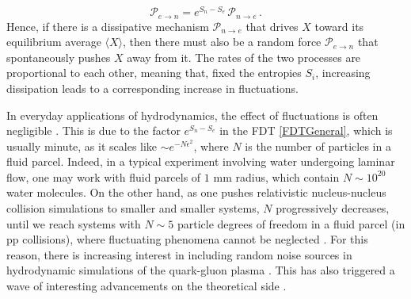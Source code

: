 \documentclass[a4paper, amsfonts, amssymb, amsmath, reprint, showkeys, nofootinbib, twoside,notitlepage,onecolumn]{revtex4-2}
\theoremstyle{definition}
\begin{document}
\begin{equation}\label{FDTGeneral}
\mathcal{P}_{e\rightarrow n} = e^{S_n-S_e} 
 \, \mathcal{P}_{n \rightarrow e} \, .
\end{equation}
Hence, if there is a dissipative mechanism $\mathcal{P}_{n\rightarrow e}$ that drives $X$ toward its equilibrium average $\langle X \rangle$, then there must also be a random force $\mathcal{P}_{e\rightarrow n}$ that spontaneously pushes $X$ away from it. The rates of the two processes are proportional to each other, meaning that, fixed the entropies $S_i$, increasing dissipation leads to a corresponding increase in fluctuations.

In everyday applications of hydrodynamics, the effect of fluctuations is often negligible \cite{huang_book}. This is due to the factor $e^{S_n-S_e}$ in the FDT \eqref{FDTGeneral}, which is usually minute, as it scales like $\sim e^{-N\epsilon^2}$, where $N$ is the number of particles in a fluid parcel. Indeed, in a typical experiment involving water undergoing laminar flow, one may work with fluid parcels of $1$ mm radius, which contain $N \sim 10^{20}$ water molecules. On the other hand, as one pushes relativistic nucleus-nucleus collision simulations to smaller and smaller systems, $N$ progressively decreases, until we reach systems with $N \sim 5$ particle degrees of freedom in a fluid parcel (in pp collisions), where fluctuating phenomena cannot be neglected \cite{Yan:2015lfa}. For this reason, there is increasing interest in including random noise sources in hydrodynamic simulations of the quark-gluon plasma \cite{Singh:2018dpk,Singh:2021mks}. This has also triggered a wave of interesting advancements on the theoretical side \cite{Akamatsu:2016llw,Martinez:2018wia,Nahrgang:2018afz,An:2019osr,An:2020vri,An:2022jgc,Mullins:2023tjg,Mullins:2023bur,Jain:2023obu}.
\end{document}
